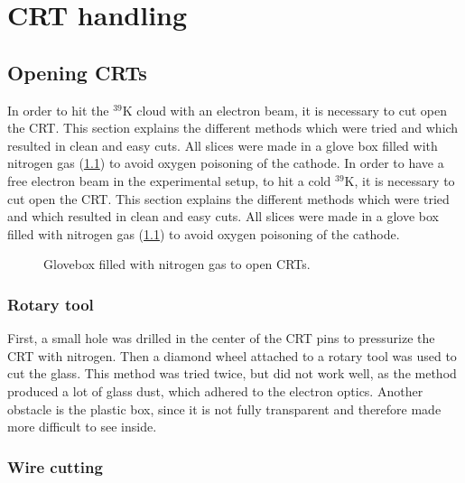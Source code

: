 
\chapter{CRT handling}
\label{chap:CRT handling}

\section{Opening CRTs}
\label{sec:Opening CRTs}

In order to hit the $^{39}\mathrm{K}$ cloud with an electron beam, it is necessary to cut open the CRT. This section explains the different methods which were tried and which resulted in clean and easy cuts. All slices were made in a glove box filled with nitrogen gas (\cref{fig:glovebox}) to avoid oxygen poisoning of the cathode.
In order to have a free electron beam in the experimental setup, to hit a cold $^{39}\mathrm{K}$, it is necessary to cut open the CRT. This section explains the different methods which were tried and which resulted in clean and easy cuts. All slices were made in a glove box filled with nitrogen gas (\cref{fig:glovebox}) to avoid  oxygen poisoning of the cathode.

\begin{figure}[h]
	
	\caption{Glovebox filled with nitrogen gas to open CRTs.}
	\label{fig:glovebox}
\end{figure}


\subsection{Rotary tool}
\label{subsec:Rotary tool}


First, a small hole was drilled in the center of the CRT pins to pressurize the CRT with nitrogen. Then a diamond wheel attached to a rotary tool was used to cut the glass. This method was tried twice, but did not work well, as the method produced a lot of glass dust, which adhered to the electron optics. Another obstacle is the plastic box, since it is not fully transparent and therefore made more difficult to see inside. 


\subsection{Wire cutting}
\label{subsec:Wire cutting}

